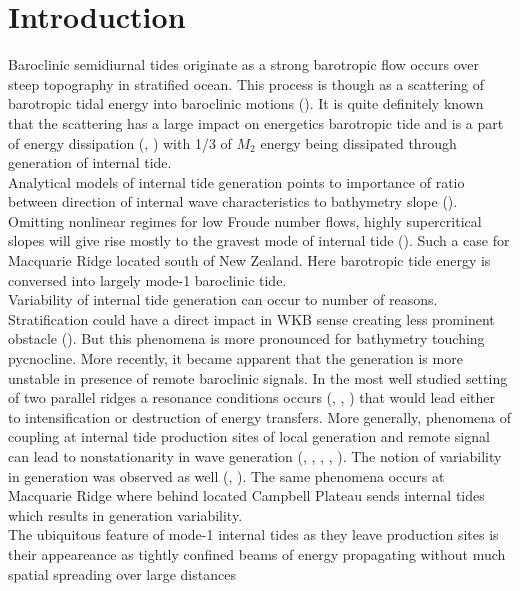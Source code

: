 \documentclass[12pt]{article}
\begin{document}
\section{Introduction}
Baroclinic semidiurnal tides originate as a strong barotropic flow occurs over steep topography in stratified ocean. This process is though as a scattering of barotropic tidal energy into baroclinic motions (\cite{ROG:ROG324}). It is quite definitely known that the scattering has a large impact on energetics barotropic tide and is a part of energy dissipation (\cite{egbert2000significant}, \cite{munk1997once}) with 1/3 of $M_2$ energy being dissipated through generation of internal tide.\\
Analytical models of internal tide generation points to importance of ratio between direction of 
internal wave characteristics to bathymetry slope (\cite{garrett2007internal}). Omitting nonlinear 
regimes for low Froude number flows, highly supercritical slopes will give rise mostly to the 
gravest mode of internal tide (\cite{echeverri2010internal}). Such a case for Macquarie Ridge 
located south of New Zealand. Here barotropic tide energy is conversed into largely mode-1 
baroclinic tide.\\
Variability of internal tide generation can occur to number of reasons. Stratification could have a direct impact in WKB sense creating less prominent obstacle (\cite{holloway1999internal}). But this phenomena is more pronounced for bathymetry touching pycnocline. More recently, it became apparent that the generation is more unstable in presence of remote baroclinic signals. In the most well studied setting of two parallel ridges a resonance conditions occurs (\cite{echeverri2010internal}, \cite{buijsman2012double}, \cite{buijsman2014three}) that would lead either to intensification or destruction of energy transfers. More generally, phenomena of coupling at internal tide production sites of local generation and remote signal can lead to nonstationarity in wave generation (\cite{Kelly2010a}, \cite{osborne2011spatial}, \cite{kerry2013effects}, \cite{xing1998three}, \cite{buijsman2012modeling}). The notion of variability in generation was observed as well (\cite{pickering2015structure}, \cite{zilberman2011incoherent}). The same phenomena occurs at Macquarie Ridge where behind located Campbell Plateau sends internal tides which results in generation variability.\\
The ubiquitous feature of mode-1 internal tides as they leave production sites is their appeareance 
as tightly confined beams of energy propagating without much spatial spreading over large distances 
\end{document}
